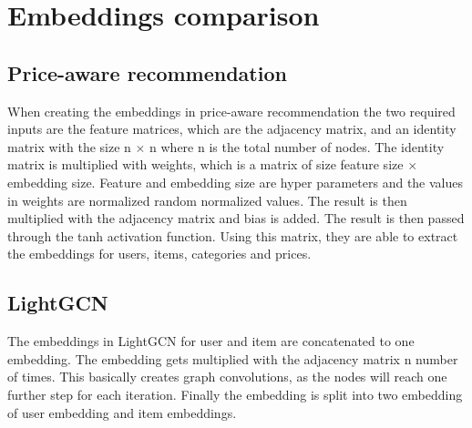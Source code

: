 \section{Embeddings comparison}
\subsection{Price-aware recommendation}
When creating the embeddings in price-aware recommendation the two required inputs are the feature matrices, which are the adjacency matrix, and an identity matrix with the size n  $\times$ n where n is the total number of nodes.
The identity matrix is multiplied with weights, which is a matrix of size feature size $\times$ embedding size. 
Feature and embedding size are hyper parameters and the values in weights are normalized random normalized values.
The result is then multiplied with the adjacency matrix and bias is added.
The result is then passed through the tanh activation function.
Using this matrix, they are able to extract the embeddings for users, items, categories and prices.

\subsection{LightGCN}
The embeddings in LightGCN for user and item are concatenated to one embedding.
The embedding gets multiplied with the adjacency matrix n number of times.
This basically creates graph convolutions, as the nodes will reach one further step for each iteration.
Finally the embedding is split into two embedding of user embedding and item embeddings.
